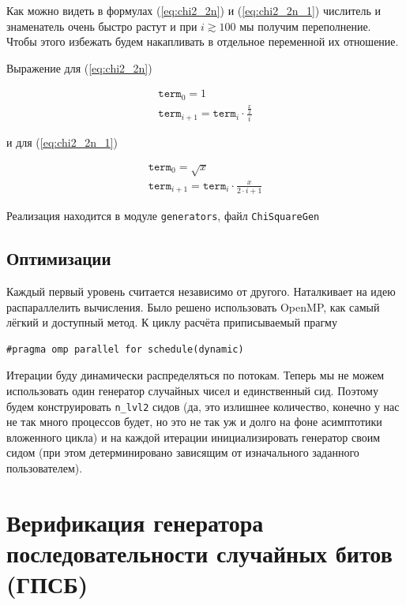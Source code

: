\documentclass[12pt]{extarticle}
\begin{document}
Как можно видеть в формулах (\ref{eq:chi2_2n}) и (\ref{eq:chi2_2n_1}) числитель и знаменатель очень быстро растут и при $i \gtrsim 100$ мы получим переполнение. Чтобы этого избежать будем накапливать в отдельное переменной их отношение.

Выражение для (\ref{eq:chi2_2n})

\begin{equation}
\begin{gathered}
    \texttt{term}_0 = 1 \\
    \texttt{term}_{i+1} = \texttt{term}_i \cdot \frac{ \frac{x}{2}}{i}
\end{gathered}
\end{equation}

и для (\ref{eq:chi2_2n_1})

\begin{equation}
\begin{gathered}
    \texttt{term}_0 = \sqrt{x} \\
    \texttt{term}_{i+1} = \texttt{term}_i \cdot \frac{x}{2 \cdot i + 1}
\end{gathered}
\end{equation}

Реализация находится в модуле \texttt{generators}, файл \texttt{ChiSquareGen}

\subsection{Оптимизации}

Каждый первый уровень считается независимо от другого. Наталкивает на идею распараллелить вычисления. Было решено использовать OpenMP, как самый лёгкий и доступный метод. К циклу расчёта приписываемый прагму

\begin{lstlisting}
#pragma omp parallel for schedule(dynamic)
\end{lstlisting}

Итерации буду динамически распределяться по потокам. Теперь мы не можем использовать один генератор случайных чисел и единственный сид. Поэтому будем конструировать \texttt{n\_lvl2} сидов (да, это излишнее количество, конечно у нас не так много процессов будет, но это не так уж и долго на фоне асимптотики вложенного цикла) и на каждой итерации инициализировать генератор своим сидом (при этом детерминировано зависящим от изначального заданного пользователем).

\section{Верификация генератора последовательности случайных битов (ГПСБ)}
\end{document}
